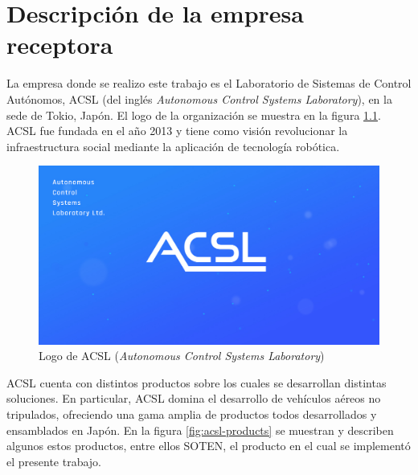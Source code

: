 \chapter{Descripción de la empresa receptora}
\label{capitulo2}

La empresa donde se realizo este trabajo es el Laboratorio de Sistemas de Control Autónomos, ACSL (del inglés \textit{Autonomous Control Systems Laboratory}), en la sede de Tokio, Japón. El logo de la organización se muestra en la figura \ref{fig:acsl-logo}. ACSL fue fundada en el año 2013 y tiene como visión revolucionar la infraestructura social mediante la aplicación de tecnología robótica.

\begin{figure}[H]
    \centering
    \includegraphics[scale=0.25]{partes/img/logo-acsl.jpg}
    \caption[Logo de ACSL (\textit{Autonomous Control Systems Laboratory})]{Logo de ACSL (\textit{Autonomous Control Systems Laboratory})}
    \label{fig:acsl-logo}
\end{figure}

ACSL cuenta con distintos productos sobre los cuales se desarrollan distintas soluciones. En particular, ACSL domina el desarrollo de vehículos aéreos no tripulados, ofreciendo una gama amplia de productos todos desarrollados y ensamblados en Japón. En la figura \ref{fig:acsl-products} se muestran y describen algunos estos productos, entre ellos SOTEN, el producto en el cual se implementó el presente trabajo.

